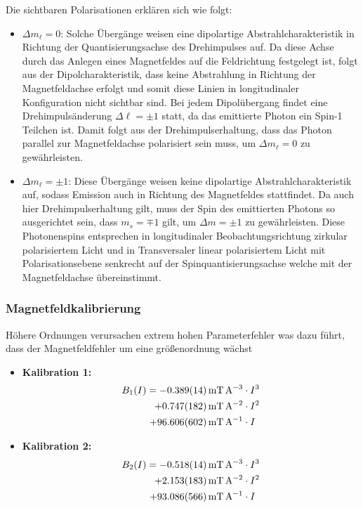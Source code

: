 \documentclass[11pt, a4paper]{article}
\begin{document}
Die sichtbaren Polarisationen erklären sich wie folgt:
\begin{itemize}
	\item $\Delta m_\ell = 0$: Solche Übergänge weisen eine dipolartige Abstrahlcharakteristik in Richtung der Quantisierungsachse des Drehimpulses auf.
	Da diese Achse durch das Anlegen eines Magnetfeldes auf die Feldrichtung festgelegt ist, folgt aus der Dipolcharakteristik, dass keine Abstrahlung in Richtung der Magnetfeldachse erfolgt und somit diese Linien in longitudinaler Konfiguration nicht sichtbar sind.
	Bei jedem Dipolübergang findet eine Drehimpulsänderung $\Delta \ell = \pm 1$ statt, da das emittierte Photon ein Spin-1 Teilchen ist.
	Damit folgt aus der Drehimpulserhaltung, dass das Photon parallel zur Magnetfeldachse polarisiert sein muss, um $\Delta m_\ell = 0$ zu gewährleisten.
	
	\item $\Delta m_\ell = \pm 1$: Diese Übergänge weisen keine dipolartige Abstrahlcharakteristik auf, sodass Emission auch in Richtung des Magnetfeldes stattfindet.
	Da auch hier Drehimpulserhaltung gilt, muss der Spin des emittierten Photons so ausgerichtet sein, dass $m_s = \mp 1$ gilt, um $\Delta m = \pm 1$ zu gewährleisten.
	Diese Photonenspins entsprechen in longitudinaler Beobachtungsrichtung zirkular polarisiertem Licht und in Transversaler linear polarisiertem Licht mit Polarisationsebene senkrecht auf der Spinquantisierungsachse welche mit der Magnetfeldachse übereinstimmt.
\end{itemize}


\subsubsection{Magnetfeldkalibrierung}
Höhere Ordnungen verursachen extrem hohen Parameterfehler was dazu führt, dass der Magnetfeldfehler um eine größenordnung wächst

\begin{itemize}
	\item \textbf{Kalibration 1:}
	\begin{align}
	B_1(I) = \SI{-0.389 +- 0.014}{\milli\tesla\per\ampere\cubed} &\cdot I^3 \nonumber\\
	+\SI{0.747+-0.182}{\milli\tesla\per\ampere\squared} &\cdot I^2 \nonumber\\
	+ \SI{96.606 +- 0.602}{\milli\tesla\per\ampere} &\cdot I
	\end{align}
	\item \textbf{Kalibration 2:}
	\begin{align}
	B_2(I) = \SI{-0.518 +- 0.014}{\milli\tesla\per\ampere\cubed} &\cdot I^3 \nonumber\\
	+\SI{2.153+-0.183}{\milli\tesla\per\ampere\squared} &\cdot I^2 \nonumber\\
	+ \SI{93.086 +- 0.566}{\milli\tesla\per\ampere} &\cdot I
	\end{align}
\end{itemize}
\end{document}
